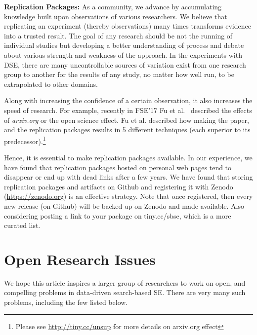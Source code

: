 \documentclass[sigconf,anonymous,review]{acmart}
\begin{document}
  \noindent\textbf{Replication Packages: } As a community, we advance by accumulating knowledge built upon observations of various researchers. We believe that replicating an experiment (thereby observations) many times transforms evidence into a trusted result. The goal of any research should be not the running
of individual studies but developing a better understanding
of process and debate about various strength and weakness of the approach.
In the experiments with DSE, there are many uncontrollable sources of variation exist from
one research group to another for the results of any study, no
matter how well run, to be extrapolated to other domains. 

Along with increasing the confidence of a certain observation, it also increases the speed of research. For example, recently in FSE'17 Fu et al.~\cite{fu2017revisiting} described the effects of \textit{arxiv.org} or the open science effect. Fu et al. described how making the paper, and the replication packages results in 5 different techniques (each superior to its predecessor).\footnote{Please see \url{http://tiny.cc/unsup}  for more details on arxiv.org effect} 

Hence, it is essential to make replication packages available. 
In our experience, we have found that replication packages hosted on personal web pages tend to disappear or end up with dead links after a few years.
We have found that storing replication packages and artifacts on Github and registering it with Zenodo (\href{https://zenodo.org}{https://zenodo.org}) is an effective strategy. 
Note that once registered, then every new release (on Github) will be backed up on Zenodo and made available. Also considering posting a link to your package on tiny.cc/sbse, which is a more curated list. 
    
     


\section{Open Research Issues} \label{sec:open}
We hope this article inspires a larger group of researchers to work
on open, and compelling problems
in data-driven search-based SE. There are very many such problems, including the few listed below.
\end{document}
